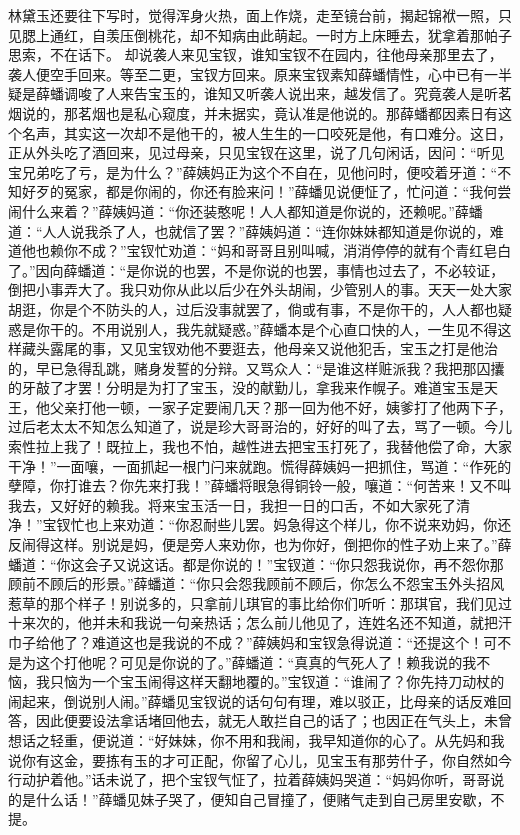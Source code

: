 \documentclass[12pt,oneside]{book}
\begin{document}
林黛玉还要往下写时，觉得浑身火热，面上作烧，走至镜台前，揭起锦袱一照，只见腮上通红，自羡压倒桃花，却不知病由此萌起。一时方上床睡去，犹拿着那帕子思索，不在话下。
却说袭人来见宝钗，谁知宝钗不在园内，往他母亲那里去了，袭人便空手回来。等至二更，宝钗方回来。原来宝钗素知薛蟠情性，心中已有一半疑是薛蟠调唆了人来告宝玉的，谁知又听袭人说出来，越发信了。究竟袭人是听茗烟说的，那茗烟也是私心窥度，并未据实，竟认准是他说的。那薛蟠都因素日有这个名声，其实这一次却不是他干的，被人生生的一口咬死是他，有口难分。这日，正从外头吃了酒回来，见过母亲，只见宝钗在这里，说了几句闲话，因问：“听见宝兄弟吃了亏，是为什么？”薛姨妈正为这个不自在，见他问时，便咬着牙道：“不知好歹的冤家，都是你闹的，你还有脸来问！”薛蟠见说便怔了，忙问道：“我何尝闹什么来着？”薛姨妈道：“你还装憨呢！人人都知道是你说的，还赖呢。”薛蟠道：“人人说我杀了人，也就信了罢？”薛姨妈道：“连你妹妹都知道是你说的，难道他也赖你不成？”宝钗忙劝道：“妈和哥哥且别叫喊，消消停停的就有个青红皂白了。”因向薛蟠道：“是你说的也罢，不是你说的也罢，事情也过去了，不必较证，倒把小事弄大了。我只劝你从此以后少在外头胡闹，少管别人的事。天天一处大家胡逛，你是个不防头的人，过后没事就罢了，倘或有事，不是你干的，人人都也疑惑是你干的。不用说别人，我先就疑惑。”薛蟠本是个心直口快的人，一生见不得这样藏头露尾的事，又见宝钗劝他不要逛去，他母亲又说他犯舌，宝玉之打是他治的，早已急得乱跳，赌身发誓的分辩。又骂众人：“是谁这样赃派我？我把那囚攮的牙敲了才罢！分明是为打了宝玉，没的献勤儿，拿我来作幌子。难道宝玉是天王，他父亲打他一顿，一家子定要闹几天？那一回为他不好，姨爹打了他两下子，过后老太太不知怎么知道了，说是珍大哥哥治的，好好的叫了去，骂了一顿。今儿索性拉上我了！既拉上，我也不怕，越性进去把宝玉打死了，我替他偿了命，大家干净！”一面嚷，一面抓起一根门闩来就跑。慌得薛姨妈一把抓住，骂道：“作死的孽障，你打谁去？你先来打我！”薛蟠将眼急得铜铃一般，嚷道：“何苦来！又不叫我去，又好好的赖我。将来宝玉活一日，我担一日的口舌，不如大家死了清净！”宝钗忙也上来劝道：“你忍耐些儿罢。妈急得这个样儿，你不说来劝妈，你还反闹得这样。别说是妈，便是旁人来劝你，也为你好，倒把你的性子劝上来了。”薛蟠道：“你这会子又说这话。都是你说的！”宝钗道：“你只怨我说你，再不怨你那顾前不顾后的形景。”薛蟠道：“你只会怨我顾前不顾后，你怎么不怨宝玉外头招风惹草的那个样子！别说多的，只拿前儿琪官的事比给你们听听：那琪官，我们见过十来次的，他并未和我说一句亲热话；怎么前儿他见了，连姓名还不知道，就把汗巾子给他了？难道这也是我说的不成？”薛姨妈和宝钗急得说道：“还提这个！可不是为这个打他呢？可见是你说的了。”薛蟠道：“真真的气死人了！赖我说的我不恼，我只恼为一个宝玉闹得这样天翻地覆的。”宝钗道：“谁闹了？你先持刀动杖的闹起来，倒说别人闹。”薛蟠见宝钗说的话句句有理，难以驳正，比母亲的话反难回答，因此便要设法拿话堵回他去，就无人敢拦自己的话了；也因正在气头上，未曾想话之轻重，便说道：“好妹妹，你不用和我闹，我早知道你的心了。从先妈和我说你有这金，要拣有玉的才可正配，你留了心儿，见宝玉有那劳什子，你自然如今行动护着他。”话未说了，把个宝钗气怔了，拉着薛姨妈哭道：“妈妈你听，哥哥说的是什么话！”薛蟠见妹子哭了，便知自己冒撞了，便赌气走到自己房里安歇，不提。
\end{document}
